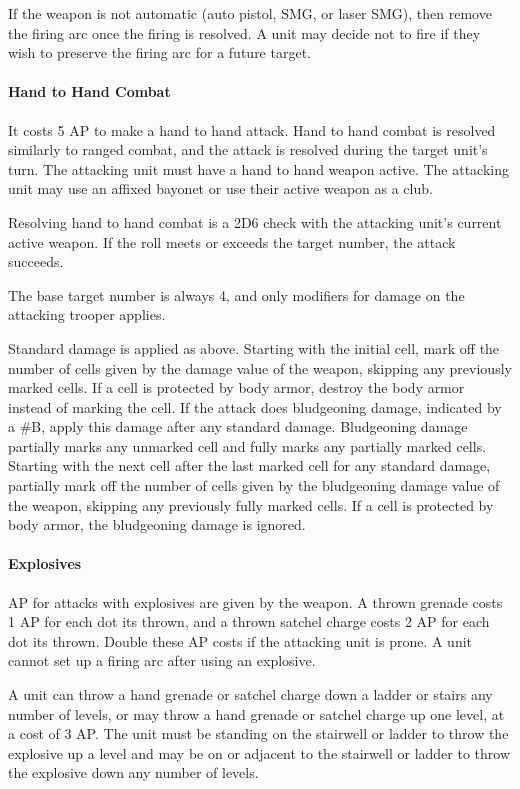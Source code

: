 If the weapon is not automatic (auto pistol, SMG, or laser SMG), then remove the firing arc once the firing is resolved.
A unit may decide not to fire if they wish to preserve the firing arc for a future target.

\paragraph*{Hand to Hand Combat}

It costs 5 AP to make a hand to hand attack.
Hand to hand combat is resolved similarly to ranged combat, and the attack is resolved during the target unit's turn.
The attacking unit must have a hand to hand weapon active.
The attacking unit may use an affixed bayonet or use their active weapon as a club.

Resolving hand to hand combat is a 2D6 check with the attacking unit's current active weapon.
If the roll meets or exceeds the target number, the attack succeeds.

The base target number is always 4, and only modifiers for damage on the attacking trooper applies.

Standard damage is applied as above.
Starting with the initial cell, mark off the number of cells given by the damage value of the weapon, skipping any previously marked cells.
If a cell is protected by body armor, destroy the body armor instead of marking the cell.
If the attack does bludgeoning damage, indicated by a \#B, apply this damage after any standard damage.
Bludgeoning damage partially marks any unmarked cell and fully marks any partially marked cells.
Starting with the next cell after the last marked cell for any standard damage, partially mark off the number of cells given by the bludgeoning damage value of the weapon, skipping any previously fully marked cells.
If a cell is protected by body armor, the bludgeoning damage is ignored.

\paragraph*{Explosives}

AP for attacks with explosives are given by the weapon.
A thrown grenade costs 1 AP for each dot its thrown, and a thrown satchel charge costs 2 AP for each dot its thrown.
Double these AP costs if the attacking unit is prone.
A unit cannot set up a firing arc after using an explosive.

A unit can throw a hand grenade or satchel charge down a ladder or stairs any number of levels, or may throw a hand grenade or satchel charge up one level, at a cost of 3 AP.
The unit must be standing on the stairwell or ladder to throw the explosive up a level and may be on or adjacent to the stairwell or ladder to throw the explosive down any number of levels.

